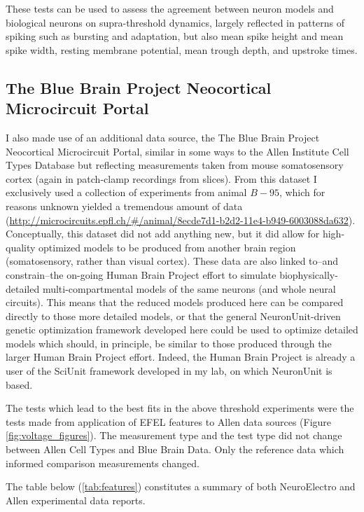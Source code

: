
These tests can be used to assess the agreement between neuron models and biological neurons on supra-threshold dynamics, largely reflected in patterns of spiking such as bursting and adaptation, but also mean spike height and mean spike width, resting membrane potential, mean trough depth, and upstroke times.

\subsection{The Blue Brain Project Neocortical Microcircuit Portal}
\label{sec:bluebrain-data}
I also made use of an additional data source, the The Blue Brain Project Neocortical Microcircuit Portal, similar in some ways to the Allen Institute Cell Types Database but reflecting measurements taken from mouse somatosensory cortex (again in patch-clamp recordings from slices).
From this dataset I exclusively used a collection of experiments from animal $B-95$, which for reasons unknown yielded a tremendous amount of data (\url{http://microcircuits.epfl.ch/#/animal/8ecde7d1-b2d2-11e4-b949-6003088da632}).
Conceptually, this dataset did not add anything new, but it did allow for high-quality optimized models to be produced from another brain region (somatosensory, rather than visual cortex).
These data are also linked to--and constrain--the on-going Human Brain Project effort to simulate biophysically-detailed multi-compartmental models of the same neurons (and whole neural circuits).
This means that the reduced models produced here can be compared directly to those more detailed models, or that the general NeuronUnit-driven genetic optimization framework developed here could be used to optimize detailed models which should, in principle, be similar to those produced through the larger Human Brain Project effort.
Indeed, the Human Brain Project is already a user of the SciUnit framework developed in my lab, on which NeuronUnit is based.

The tests which lead to the best fits in the above threshold experiments were the tests made from application of EFEL features to Allen data sources (Figure \ref{fig:voltage_figures}). The measurement type and the test type did not change between Allen Cell Types and Blue Brain Data. Only the reference data which informed comparison measurements changed. %

The table below (\ref{tab:features}) constitutes a summary of both NeuroElectro and Allen experimental data reports. %

